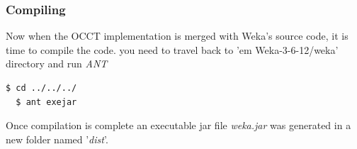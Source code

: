 \documentclass[a4paper,12pt]{article}
\begin{document}
\begin{spacing}{1.5}
\subsubsection{Compiling}
Now when the OCCT implementation is merged with Weka's source code, it is time to compile the code.
you need to travel back to '{em Weka-3-6-12/weka}' directory and run {\em ANT}
\begin{lstlisting}[language=bash,frame=none,backgroundcolor=\color{anti-flashwhite}]
  $ cd ../../../
  $ ant exejar
\end{lstlisting}
Once compilation is complete an executable jar file {\em weka.jar} was generated in a new folder named '{\em dist}'.

\clearpage

\end{spacing}
\end{document}
